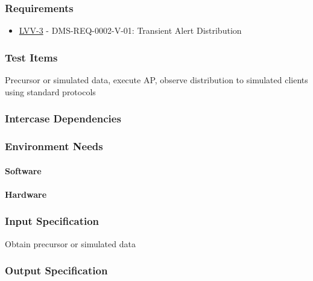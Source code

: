 \subsubsection{Requirements}
\begin{itemize}
\item \href{https://jira.lsstcorp.org/browse/LVV-3}{LVV-3} - DMS-REQ-0002-V-01: Transient Alert Distribution
\end{itemize}

\subsubsection{Test Items}
Precursor or simulated data, execute AP, observe distribution to
simulated clients using standard protocols



\subsubsection{Intercase Dependencies}

\subsubsection{Environment Needs}

\paragraph{Software}

\paragraph{Hardware}

\subsubsection{Input Specification}
{}Obtain precursor or simulated data


\subsubsection{Output Specification}

